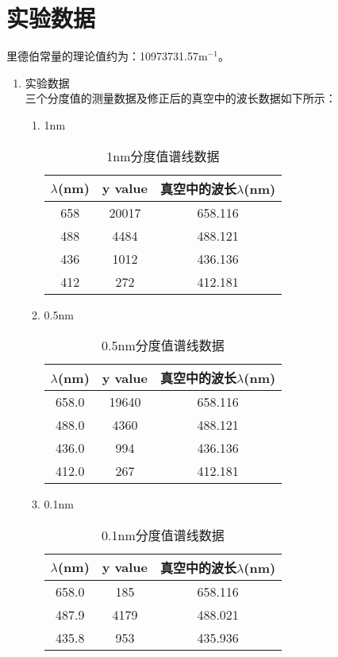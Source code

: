 \documentclass[a4paper]{article}
\begin{document}
\section{实验数据}
里德伯常量的理论值约为：10973731.57$\text{m}^{-1}$。
\begin{enumerate}
\item 实验数据\\
三个分度值的测量数据及修正后的真空中的波长数据如下所示：
\begin{enumerate}
\item 1nm
\begin{table}[!h]
\centering
\caption{1nm分度值谱线数据}
\label{table_1nm}
\begin{tabular}{|c|c|c|}
\hline
$\lambda$(nm) & y value & 真空中的波长$\lambda$(nm) \\ \hline
658           & 20017   & 658.116 \\ \hline
488           & 4484    & 488.121 \\ \hline
436           & 1012    & 436.136 \\ \hline
412           & 272     & 412.181 \\ \hline
\end{tabular}
\end{table}
\item 0.5nm
\begin{table}[!h]
\centering
\caption{0.5nm分度值谱线数据}
\label{table_05nm}
\begin{tabular}{|c|c|c|}
\hline
$\lambda$(nm) & y value & 真空中的波长$\lambda$(nm) \\ \hline
658.0           & 19640 & 658.116   \\ \hline
488.0           & 4360  & 488.121   \\ \hline
436.0           & 994   & 436.136  \\ \hline
412.0           & 267   & 412.181   \\ \hline
\end{tabular}
\end{table}
\item 0.1nm
\begin{table}[!h]
\centering
\caption{0.1nm分度值谱线数据}
\label{table_01nm}
\begin{tabular}{|c|c|c|}
\hline
$\lambda$(nm) & y value & 真空中的波长$\lambda$(nm) \\ \hline
658.0           & 185   & 658.116  \\ \hline
487.9           & 4179  & 488.021  \\ \hline
435.8           & 953   & 435.936  \\ \hline

\end{tabular}
\end{table}
\end{enumerate}
\end{enumerate}
\end{document}

